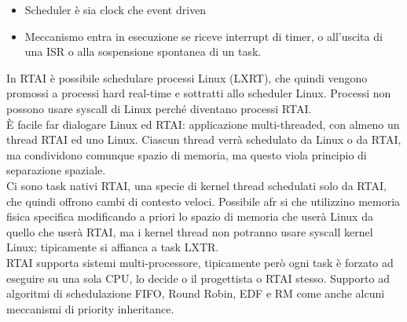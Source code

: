 \documentclass[12pt, oneside]{extbook}
\begin{document}
\begin{itemize}
\item Scheduler è sia clock che event driven
\item Meccanismo entra in esecuzione se riceve interrupt di timer, o all'uscita di una ISR o alla sospensione spontanea di un task.
\end{itemize}
In RTAI è possibile schedulare processi Linux (LXRT), che quindi vengono promossi a processi hard real-time e sottratti allo scheduler Linux. Processi non possono usare syscall di Linux perché diventano processi RTAI.\\ È facile far dialogare Linux ed RTAI: applicazione multi-threaded, con almeno un thread RTAI ed uno Linux. Ciascun thread verrà schedulato da Linux o da RTAI, ma condividono comunque spazio di memoria, ma questo viola principio di separazione spaziale.\\ Ci sono task nativi RTAI, una specie di kernel thread schedulati solo da RTAI, che quindi offrono cambi di contesto veloci. Possibile afr si che utilizzino memoria fisica specifica modificando a priori lo spazio di memoria che userà Linux da quello che userà RTAI, ma i kernel thread non potranno usare syscall kernel Linux; tipicamente si affianca a task LXTR.\\ RTAI supporta sistemi multi-processore, tipicamente però ogni task è forzato ad eseguire su una sola CPU, lo decide o il progettista o RTAI stesso. Supporto ad algoritmi di schedulazione FIFO, Round Robin, EDF e RM come anche alcuni meccanismi di priority inheritance.
\end{document}
